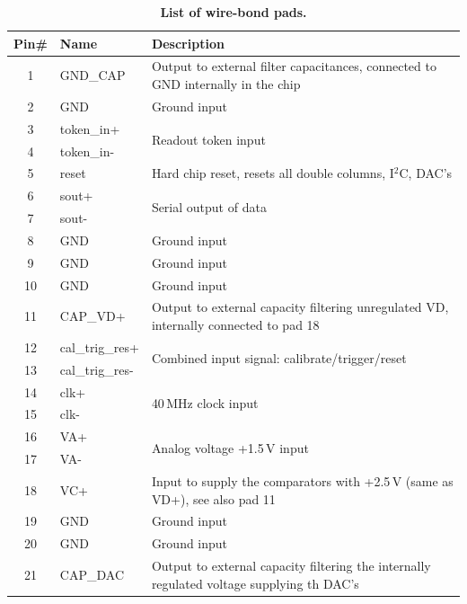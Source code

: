 \begin{table}[h]
    \begin{center}
	\caption{\textbf{List of wire-bond pads.} }
	\label{tab:ROCpinout}

	\bigskip

	{\scriptsize
	\begin{tabular}{cll}
	\toprule %
	Pin\# & Name         & Description \\
	\midrule %
	 1 & GND\_CAP        & Output to external filter capacitances, connected to GND internally in the chip \\
	 2 & GND             & Ground input \\
	 3 & token\_in+      & \multirow{2}{*}{Readout token input} \\
	 4 & token\_in-      &  \\
	 5 & reset           & Hard chip reset, resets all double columns, I$^2$C, DAC's \\
	 6 & sout+           & \multirow{2}{*}{Serial output of data} \\
	 7 & sout-           &  \\
	 8 & GND             & Ground input  \\
	 9 & GND             & Ground input  \\
	10 & GND             & Ground input  \\
	11 & CAP\_VD+        & Output to external capacity filtering unregulated VD, internally connected to pad 18 \\
	12 & cal\_trig\_res+ & \multirow{2}{*}{Combined input signal: calibrate/trigger/reset} \\
	13 & cal\_trig\_res- &  \\
	14 & clk+            & \multirow{2}{*}{40\,MHz clock input} \\
	15 & clk-            &  \\
	16 & VA+             & \multirow{2}{*}{Analog voltage +1.5\,V input} \\
	17 & VA-             &  \\
	18 & VC+             & Input to supply the comparators with +2.5\,V (same as VD+), see also pad 11 \\
	19 & GND             & Ground input  \\
	20 & GND             & Ground input  \\
	21 & CAP\_DAC        & Output to external capacity filtering the internally regulated voltage supplying th DAC's \\

\end{tabular}}
\end{center}
\end{table}
